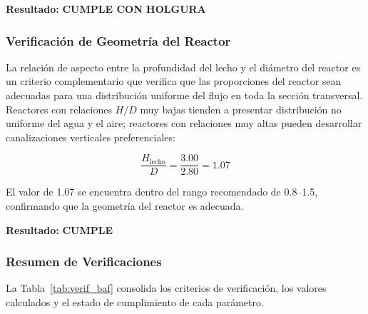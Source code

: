 \documentclass[12pt,a4paper]{article}
\begin{document}
\textbf{Resultado:} \textbf{CUMPLE CON HOLGURA}

\subsubsection*{Verificación de Geometría del Reactor}

La relación de aspecto entre la profundidad del lecho y el diámetro del reactor es un criterio complementario que verifica que las proporciones del reactor sean adecuadas para una distribución uniforme del flujo en toda la sección transversal. Reactores con relaciones $H/D$ muy bajas tienden a presentar distribución no uniforme del agua y el aire; reactores con relaciones muy altas pueden desarrollar canalizaciones verticales preferenciales:

\begin{equation}
\frac{H_{\text{lecho}}}{D} = \frac{3.00}{2.80} = 1.07
\end{equation}

El valor de 1.07 se encuentra dentro del rango recomendado de 0.8--1.5, confirmando que la geometría del reactor es adecuada.

\textbf{Resultado:} \textbf{CUMPLE}

\subsubsection*{Resumen de Verificaciones}

La Tabla~\ref{tab:verif_baf} consolida los criterios de verificación, los valores calculados y el estado de cumplimiento de cada parámetro.
\end{document}
